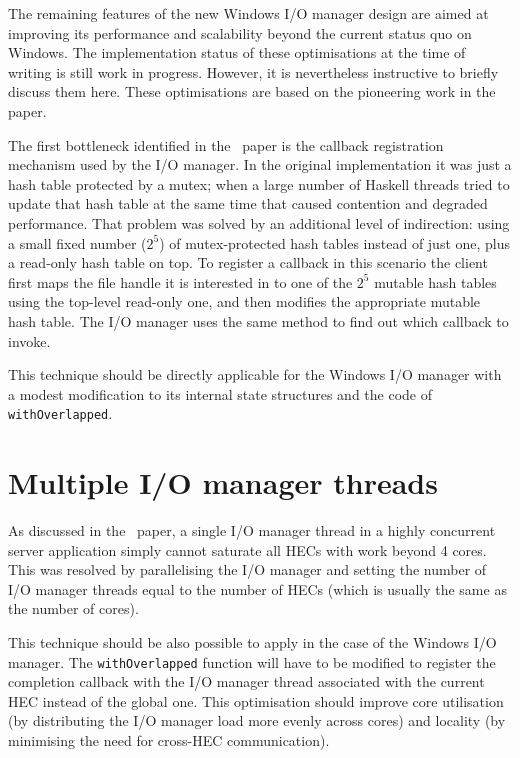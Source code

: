 \documentclass[a4paper,11pt,oneside]{report}
\begin{document}
The remaining features of the new Windows I/O manager design are aimed at
improving its performance and scalability beyond the current status quo on
Windows. The implementation status of these optimisations at the time of writing
is still work in progress. However, it is nevertheless instructive to briefly
discuss them here. These optimisations are based on the pioneering work in
the~\cite{bib:voellmy} paper.

The first bottleneck identified in the~\cite{bib:voellmy} paper is the callback
registration mechanism used by the I/O manager. In the original implementation
it was just a hash table protected by a mutex; when a large number of Haskell
threads tried to update that hash table at the same time that caused contention
and degraded performance. That problem was solved by an additional level of
indirection: using a small fixed number ($2^5$) of mutex-protected hash tables
instead of just one, plus a read-only hash table on top. To register a callback
in this scenario the client first maps the file handle it is interested in
to one of the $2^5$ mutable hash tables using the top-level read-only one, and
then modifies the appropriate mutable hash table. The I/O manager uses the same
method to find out which callback to invoke.

This technique should be directly applicable for the Windows I/O manager with a
modest modification to its internal state structures and the code of
\texttt{withOverlapped}.

\section{Multiple I/O manager threads}
\label{sec:multiple-threads}

As discussed in the~\cite{bib:voellmy} paper, a single I/O manager thread in a
highly concurrent server application simply cannot saturate all HECs with work
beyond 4 cores. This was resolved by parallelising the I/O manager and setting
the number of I/O manager threads equal to the number of HECs (which is usually
the same as the number of cores).

This technique should be also possible to apply in the case of the Windows I/O
manager. The \texttt{withOverlapped} function will have to be modified to
register the completion callback with the I/O manager thread associated with the
current HEC instead of the global one. This optimisation should improve core
utilisation (by distributing the I/O manager load more evenly across cores) and
locality (by minimising the need for cross-HEC communication).
\end{document}
